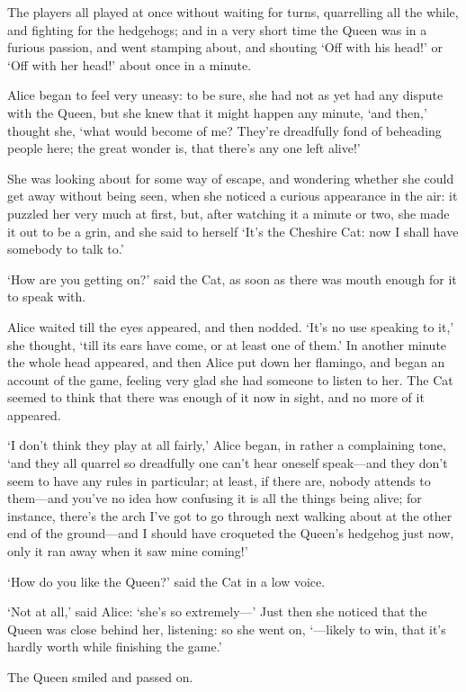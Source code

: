 \documentclass[12pt]{article}
\begin{document}
\begin{Parallel}[p]{}{}
{The players all played at once without waiting for turns, quarrelling all the while, and fighting for the hedgehogs; and in a very short time the Queen was in a furious passion, and went stamping about, and shouting ‘Off with his head!’ or ‘Off with her head!’ about once in a minute.

Alice began to feel very uneasy: to be sure, she had not as yet had any dispute with the Queen, but she knew that it might happen any minute, ‘and then,’ thought she, ‘what would become of me? They’re dreadfully fond of beheading people here; the great wonder is, that there’s any one left alive!’

She was looking about for some way of escape, and wondering whether she could get away without being seen, when she noticed a curious appearance in the air: it puzzled her very much at first, but, after watching it a minute or two, she made it out to be a grin, and she said to herself ‘It’s the Cheshire Cat: now I shall have somebody to talk to.’

‘How are you getting on?’ said the Cat, as soon as there was mouth enough for it to speak with.

Alice waited till the eyes appeared, and then nodded. ‘It’s no use speaking to it,’ she thought, ‘till its ears have come, or at least one of them.’ In another minute the whole head appeared, and then Alice put down her flamingo, and began an account of the game, feeling very glad she had someone to listen to her. The Cat seemed to think that there was enough of it now in sight, and no more of it appeared.

‘I don’t think they play at all fairly,’ Alice began, in rather a complaining tone, ‘and they all quarrel so dreadfully one can’t hear oneself speak—and they don’t seem to have any rules in particular; at least, if there are, nobody attends to them—and you’ve no idea how confusing it is all the things being alive; for instance, there’s the arch I’ve got to go through next walking about at the other end of the ground—and I should have croqueted the Queen’s hedgehog just now, only it ran away when it saw mine coming!’

‘How do you like the Queen?’ said the Cat in a low voice.

‘Not at all,’ said Alice: ‘she’s so extremely—’ Just then she noticed that the Queen was close behind her, listening: so she went on, ‘—likely to win, that it’s hardly worth while finishing the game.’

The Queen smiled and passed on.

}
\end{Parallel}
\end{document}
